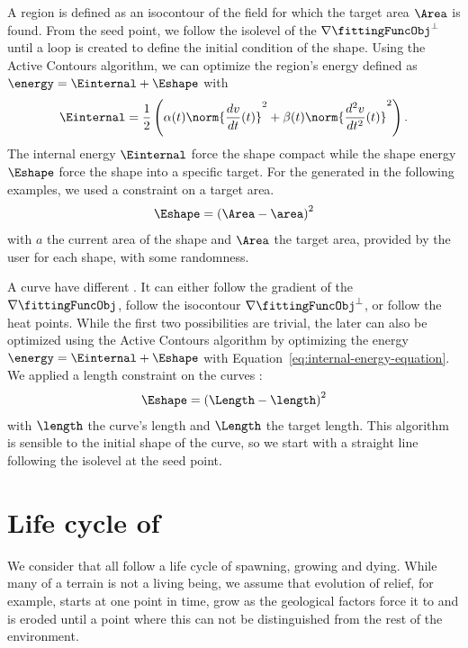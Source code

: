 A region is defined as an isocontour of the field for which the target area $\Area$ is found. From the seed point, we follow the isolevel of the  $\nabla \fittingFuncObj^\perp$ until a loop is created to define the initial condition of the shape. Using the Active Contours algorithm, we can optimize the region's energy defined as $\energy = \Einternal + \Eshape$ with  
\begin{align}
    \label{eq:internal-energy-equation}
    \Einternal = \frac{1}{2} \left( \alpha(t) \norm{\frac{d v}{d t}(t)}^2 + \beta(t) \norm{\frac{d^2 v}{d t^2}(t)}^2  \right).
\end{align}
The internal energy $\Einternal$ force the shape compact while the shape energy $\Eshape$ force the shape into a specific target. For the  generated in the following examples, we used a constraint on a target area.
\begin{align}
    \label{eq:area-target-equation}
    \Eshape = \left( \Area - \area \right)^2
\end{align}
with $a$ the current area of the shape and $\Area$ the target area, provided by the user for each shape, with some randomness.

A curve have different . It can either follow the gradient of the  $\nabla \fittingFuncObj$, follow the isocontour $\nabla \fittingFuncObj^\perp$, or follow the heat points.
While the first two possibilities are trivial, the later can also be optimized using the Active Contours algorithm by optimizing the energy $\energy = \Einternal + \Eshape$ with Equation~\eqref{eq:internal-energy-equation}. We applied a length constraint on the curves : 
\begin{align*}
    \Eshape = \left( \Length - \length \right)^2
\end{align*}
with $\length$ the curve's length and $\Length$ the target length. This algorithm is sensible to the initial shape of the curve, so we start with a straight line following the isolevel at the seed point.

\section{Life cycle of }
We consider that all  follow a life cycle of spawning, growing and dying. While many  of a terrain is not a living being, we assume that evolution of relief, for example, starts at one point in time, grow as the geological factors force it to and is eroded until a point where this  can not be distinguished from the rest of the environment. 

